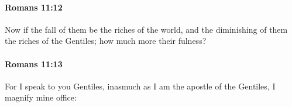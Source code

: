 		\paragraph{Romans 11:12} %
			\label{ROMANS-11-12}

			Now if the fall of them be the riches of the world, and the diminishing of them the riches of the Gentiles; how much more their fulness?

			\begin{framed}
			\scriptsize
				\begin{compactdesc}
					\item[SBLG] 
				\end{compactdesc}
			\end{framed}

		\paragraph{Romans 11:13} %
			\label{ROMANS-11-13}

			For I speak to you Gentiles, inasmuch as I am the apostle of the Gentiles, I magnify mine office:

			\begin{framed}
			\scriptsize
				\begin{compactdesc}
					\item[SBLG]  \hyperref[DOXAZO]{\grl{δοξάζω}}\gr{,}
				\end{compactdesc}
			\end{framed}

